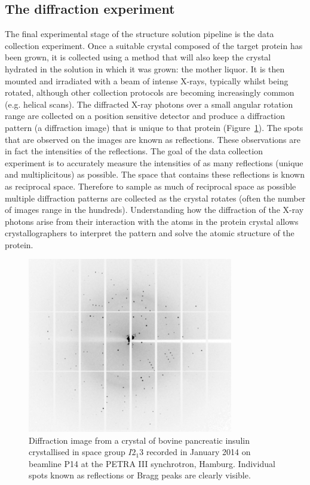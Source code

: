     \subsection{The diffraction experiment}
    \label{sub:The diffraction experiment}
        The final experimental stage of the structure solution pipeline is the data collection experiment.
        Once a suitable crystal composed of the target protein has been grown, it is collected using a method that will also keep the crystal hydrated in the solution in which it was grown: the mother liquor.
        It is then mounted and irradiated with a beam of intense X-rays, typically whilst being rotated, although other collection protocols are becoming increasingly common (e.g. helical scans).
        The diffracted X-ray photons over a small angular rotation range are collected on a position sensitive detector and produce a diffraction pattern (a diffraction image) that is unique to that protein (Figure~\ref{fig:Insulin diffraction image}).
        The spots that are observed on the images are known as reflections. These observations are in fact the intensities of the reflections.
        The goal of the data collection experiment is to accurately measure the intensities of as many reflections (unique and multiplicitous) as possible.
        The space that contains these reflections is known as reciprocal space.
        Therefore to sample as much of reciprocal space as possible multiple diffraction patterns are collected as the crystal rotates (often the number of images range in the hundreds).
        Understanding how the diffraction of the X-ray photons arise from their interaction with the atoms in the protein crystal allows crystallographers to interpret the pattern and solve the atomic structure of the protein.
        \begin{figure}
            \centering
            \includegraphics[width=0.8\textwidth]{figures/introduction/InsulinDiffractionImage.png}
            \caption{Diffraction image from a crystal of bovine pancreatic insulin crystallised in space group $I2_1 3$ recorded in January 2014 on beamline P14 at the PETRA III synchrotron, Hamburg. Individual spots known as reflections or Bragg peaks are clearly visible.}
            \label{fig:Insulin diffraction image}
        \end{figure}
